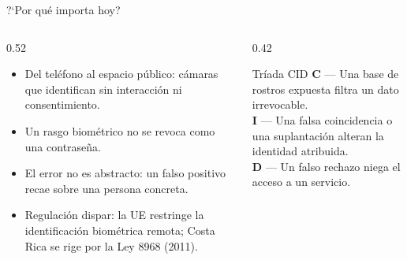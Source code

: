 \begin{frame}{?`Por qu\'e importa hoy?}
  \begin{columns}[T]
    \begin{column}{0.52\textwidth}
      \begin{itemize}\setlength{\itemsep}{6pt}
        \item Del tel\'efono al espacio p\'ublico: c\'amaras que identifican
              sin interacci\'on ni consentimiento.
        \item Un rasgo biom\'etrico no se revoca como una contrase\~na.
        \item El error no es abstracto: un falso positivo recae sobre una
              persona concreta.
        \item Regulaci\'on dispar: la UE restringe la identificaci\'on
              biom\'etrica remota; Costa Rica se rige por la Ley 8968
              (2011).
      \end{itemize}
    \end{column}
    \begin{column}{0.42\textwidth}
      \begin{block}{Tr\'iada CID}
        \scriptsize
        \textbf{C} --- Una base de rostros expuesta filtra un dato
        irrevocable.\\[3pt]
        \textbf{I} --- Una falsa coincidencia o una suplantaci\'on alteran
        la identidad atribuida.\\[3pt]
        \textbf{D} --- Un falso rechazo niega el acceso a un servicio.
      \end{block}
    \end{column}
  \end{columns}
\end{frame}